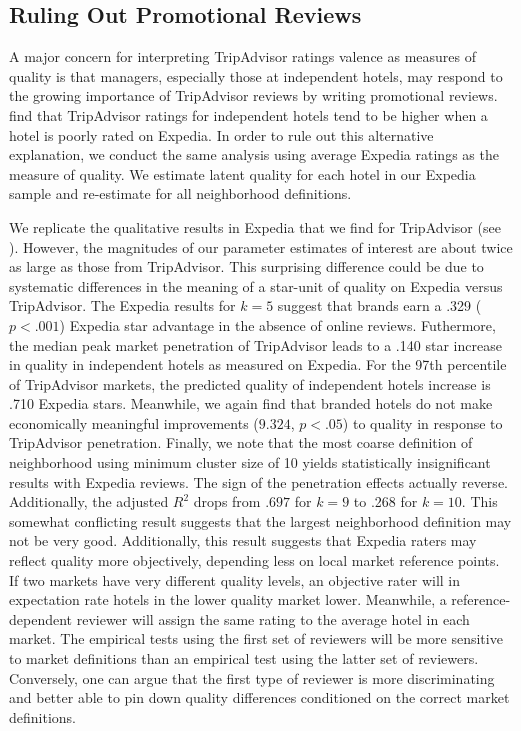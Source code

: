 \documentclass[12pt, leqno]{article}
\begin{document}
\subsection{Ruling Out Promotional Reviews}

A major concern for interpreting TripAdvisor ratings valence as measures of quality is that managers, especially those at independent hotels, may respond to the growing importance of TripAdvisor reviews by writing promotional reviews. \citet{mayzlin2014promotional} find that TripAdvisor ratings for independent hotels tend to be higher when a hotel is poorly rated on Expedia. In order to rule out this alternative explanation, we conduct the same analysis using average Expedia ratings as the measure of quality. We estimate latent quality for each hotel in our Expedia sample and re-estimate  for all neighborhood definitions. 

We replicate the qualitative results in Expedia that we find for TripAdvisor (see ). However, the magnitudes of our parameter estimates of interest are about twice as large as those from TripAdvisor. This surprising difference could be due to systematic differences in the meaning of a star-unit of quality on Expedia versus TripAdvisor. The Expedia results for $k=5$ suggest that brands earn a .329 ($p<.001$) Expedia star advantage in the absence of online reviews. Futhermore, the median peak market penetration of TripAdvisor leads to a .140 star increase in quality in independent hotels as measured on Expedia. For the 97th percentile of TripAdvisor markets, the predicted quality of independent hotels increase is .710 Expedia stars. Meanwhile, we again find that branded hotels do not make economically meaningful improvements ($9.324$, $p<.05$) to quality in response to TripAdvisor penetration. Finally, we note that the most coarse definition of neighborhood using minimum cluster size of 10 yields statistically insignificant results with Expedia reviews. The sign of the penetration effects actually reverse. Additionally, the adjusted $R^2$ drops from $.697$ for $k=9$ to .268 for $k=10$. This somewhat conflicting result suggests that the largest neighborhood definition may not be very good. Additionally, this result suggests that Expedia raters may reflect quality more objectively, depending less on local market reference points. If two markets have very different quality levels, an objective rater will in expectation rate hotels in the lower quality market lower. Meanwhile, a reference-dependent reviewer will assign the same rating to the average hotel in each market. The empirical tests using the first set of reviewers will be more sensitive to market definitions than an empirical test using the latter set of reviewers. Conversely, one can argue that the first type of reviewer is more discriminating and better able to pin down quality differences conditioned on the correct market definitions. 
\end{document}
